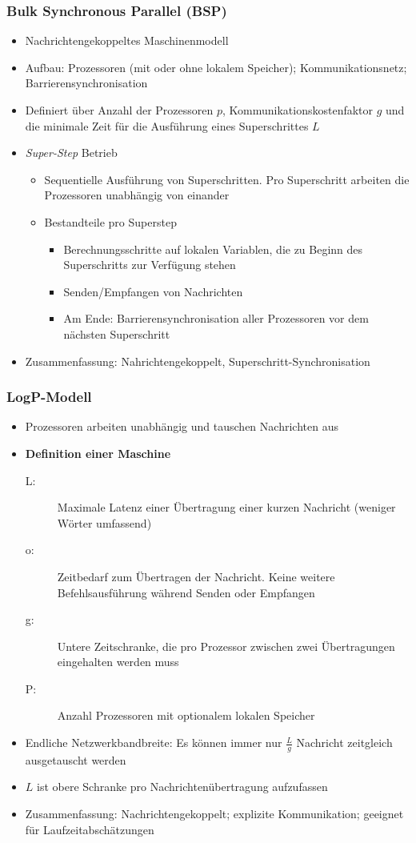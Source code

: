 \subsubsection{Bulk Synchronous Parallel (BSP)}
\begin{itemize}
	\item Nachrichtengekoppeltes Maschinenmodell
	\item Aufbau: Prozessoren (mit oder ohne lokalem Speicher); Kommunikationsnetz; Barrierensynchronisation
	\item Definiert über Anzahl der Prozessoren \(p\), Kommunikationskostenfaktor \(g\) und die minimale Zeit für die Ausführung eines Superschrittes \(L\)
	\item \textit{Super-Step} Betrieb
	\begin{itemize}
		\item Sequentielle Ausführung von Superschritten. Pro Superschritt arbeiten die Prozessoren unabhängig von einander
		\item Bestandteile pro Superstep
		\begin{itemize}
			\item Berechnungsschritte auf lokalen Variablen, die zu Beginn des Superschritts zur Verfügung stehen
			\item Senden/Empfangen von Nachrichten
			\item Am Ende: Barrierensynchronisation aller Prozessoren vor dem nächsten Superschritt
		\end{itemize}
	\end{itemize}
	\item Zusammenfassung: Nahrichtengekoppelt, Superschritt-Synchronisation
\end{itemize}

\subsubsection{LogP-Modell}
\begin{itemize}
	\item Prozessoren arbeiten unabhängig und tauschen Nachrichten aus
	\item \textbf{Definition einer Maschine}
	\begin{description}
		\item[L:] Maximale Latenz einer Übertragung einer kurzen Nachricht (weniger Wörter umfassend)
		\item[o:] Zeitbedarf zum Übertragen der Nachricht. Keine weitere Befehlsausführung während Senden oder Empfangen
		\item[g:] Untere Zeitschranke, die pro Prozessor zwischen zwei Übertragungen eingehalten werden muss
		\item[P:] Anzahl Prozessoren mit optionalem lokalen Speicher
	\end{description}
	\item Endliche Netzwerkbandbreite: Es können immer nur \(\frac{L}{g}\) Nachricht zeitgleich ausgetauscht werden
	\item \(L\) ist obere Schranke pro Nachrichtenübertragung aufzufassen
	\item Zusammenfassung: Nachrichtengekoppelt; explizite Kommunikation; geeignet für Laufzeitabschätzungen
\end{itemize}



